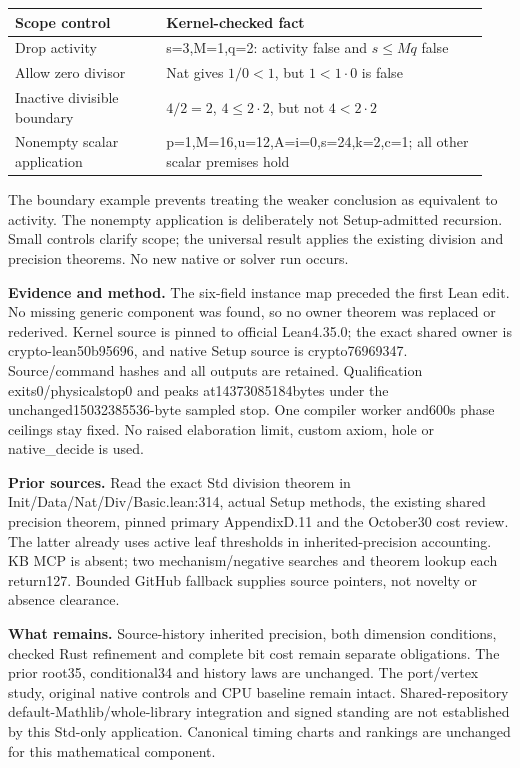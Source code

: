 \documentclass[10pt]{article}
\begin{document}
\begin{tabular}{p{0.30\linewidth}p{0.64\linewidth}}
\toprule
Scope control & Kernel-checked fact\\\midrule
Drop activity &s=3,M=1,q=2: activity false and $s\le Mq$ false\\
Allow zero divisor &Nat gives $1/0<1$, but $1<1\cdot0$ is false\\
Inactive divisible boundary &$4/2=2$, $4\le2\cdot2$, but not $4<2\cdot2$\\
Nonempty scalar application &p=1,M=16,u=12,A=i=0,s=24,k=2,c=1; all other scalar premises hold\\
\bottomrule
\end{tabular}

The boundary example prevents treating the weaker conclusion as equivalent
to activity. The nonempty application is deliberately not Setup-admitted
recursion. Small controls clarify scope; the universal result applies the
existing division and precision theorems. No new native or solver run occurs.

\textbf{Evidence and method.} The six-field instance map preceded the first
Lean edit. No missing generic component was found, so no owner theorem was
replaced or rederived. Kernel source is pinned to official Lean4.35.0;
the exact shared owner is crypto-lean50b95696, and native Setup source is
crypto76969347. Source/command hashes and all outputs are retained.
Qualification exits0/physicalstop0 and peaks at14373085184bytes under the
unchanged15032385536-byte sampled stop. One compiler worker and600s phase
ceilings stay fixed. No raised elaboration limit, custom axiom, hole or
native\_decide is used.

\textbf{Prior sources.} Read the exact Std division theorem in
Init/Data/Nat/Div/Basic.lean:314, actual Setup methods, the existing shared
precision theorem, pinned primary AppendixD.11 and the October30 cost review.
The latter already uses active leaf thresholds in inherited-precision
accounting. KB MCP is absent; two mechanism/negative searches and theorem
lookup each return127. Bounded GitHub fallback supplies source pointers,
not novelty or absence clearance.

\textbf{What remains.} Source-history inherited precision, both dimension
conditions, checked Rust refinement and complete bit cost remain separate
obligations. The prior root35, conditional34 and history laws are unchanged.
The port/vertex study, original native controls and CPU baseline remain intact.
Shared-repository default-Mathlib/whole-library integration and signed standing
are not established by this Std-only application. Canonical timing charts and
rankings are unchanged for this mathematical component.
\end{document}
